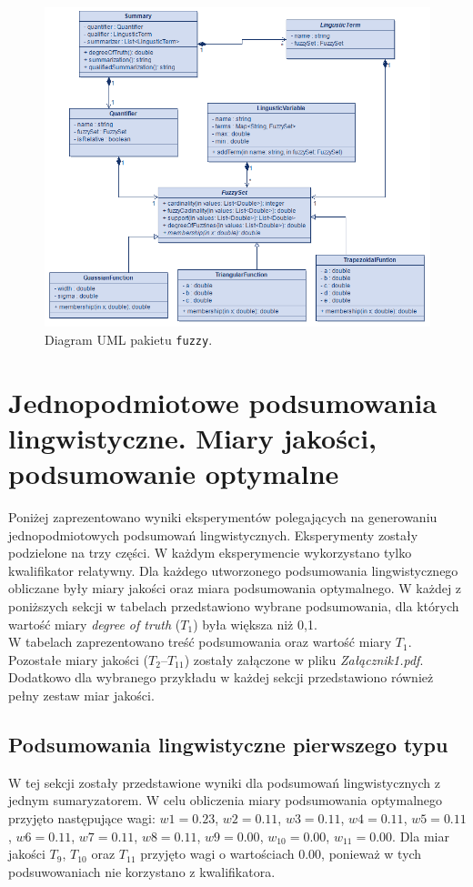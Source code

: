 \documentclass{article}
\begin{document}
\begin{figure}[H]
\centering
\includegraphics[width=\textwidth]{img/lingustic.png}
\caption{Diagram UML pakietu \texttt{fuzzy}.}
\end{figure}


\section{ Jednopodmiotowe podsumowania lingwistyczne. Miary jakości, podsumowanie optymalne}
Poniżej zaprezentowano wyniki eksperymentów polegających na generowaniu jednopodmiotowych podsumowań lingwistycznych. Eksperymenty zostały podzielone na trzy części. W każdym eksperymencie wykorzystano tylko kwalifikator relatywny. Dla każdego utworzonego podsumowania lingwistycznego obliczane były miary jakości oraz miara podsumowania optymalnego. W każdej z poniższych sekcji w tabelach przedstawiono wybrane podsumowania, dla których wartość miary \textit{degree of truth} (\(T_1\)) była większa niż 0{,}1. \\
W tabelach zaprezentowano treść podsumowania oraz wartość miary \(T_1\). Pozostałe miary jakości (\(T_2\)–\(T_{11}\)) zostały załączone w pliku \textit{Załącznik1.pdf}. Dodatkowo dla wybranego przykładu w każdej sekcji przedstawiono również pełny zestaw miar jakości.


\subsection{Podsumowania lingwistyczne pierwszego typu}
W tej sekcji zostały przedstawione wyniki dla podsumowań lingwistycznych z jednym sumaryzatorem.
W celu obliczenia miary podsumowania optymalnego przyjęto następujące wagi: \(w1 = 0.23\), \(w2 = 0.11\), \(w3 = 0.11\), \(w4 = 0.11\), \(w5 = 0.11\), \(w6 = 0.11\), \(w7 = 0.11\), \(w8 = 0.11\), \(w9 = 0.00\), \(w_{10} = 0.00\), \(w_{11} = 0.00\). Dla miar jakości \(T_9\), \(T_{10}\) oraz \(T_{11}\) przyjęto wagi o wartościach 0.00, ponieważ w tych podsuwowaniach nie korzystano z kwalifikatora.
\end{document}
